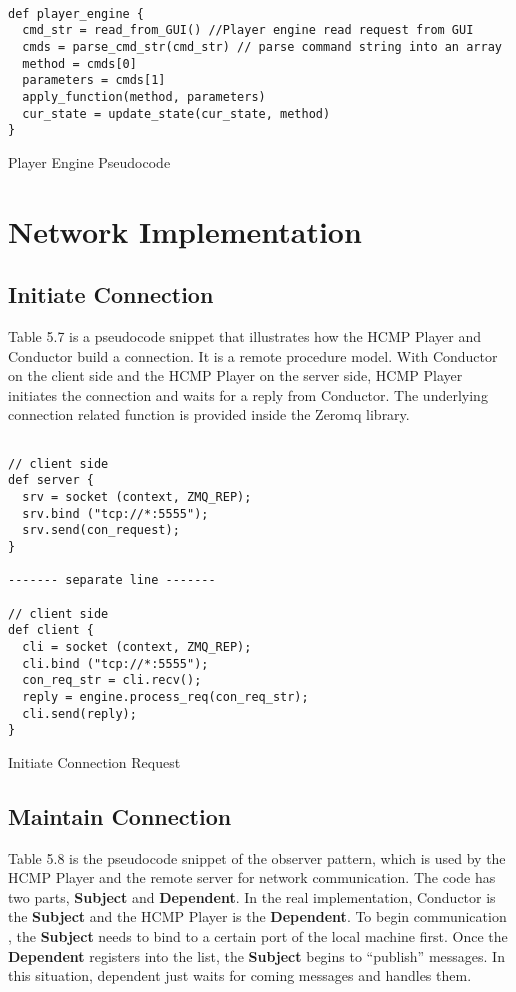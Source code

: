 \begin{table}[htdp]
\centering
\begin{lstlisting}

def player_engine {
  cmd_str = read_from_GUI() //Player engine read request from GUI 
  cmds = parse_cmd_str(cmd_str) // parse command string into an array
  method = cmds[0]
  parameters = cmds[1]
  apply_function(method, parameters)
  cur_state = update_state(cur_state, method)
}

\end{lstlisting}
\caption[Player Engine Pseudocode]{Player Engine Pseudocode}
\end{table}

\section{Network Implementation}

\subsection{Initiate Connection}
Table 5.7 is a pseudocode snippet that illustrates how the HCMP Player and   
Conductor build a connection. It is a remote procedure model.
With Conductor on the client side and the HCMP Player on the server side, HCMP 
Player initiates the connection and waits for a reply from Conductor. The 
underlying connection related function is provided inside the Zeromq library.

\begin{table}[htdp]
\centering
\begin{lstlisting}

// client side
def server {
  srv = socket (context, ZMQ_REP);
  srv.bind ("tcp://*:5555");
  srv.send(con_request);
}

------- separate line -------

// client side
def client {
  cli = socket (context, ZMQ_REP);
  cli.bind ("tcp://*:5555");
  con_req_str = cli.recv();
  reply = engine.process_req(con_req_str);
  cli.send(reply);
}

\end{lstlisting}
\caption[Initiate Connection Request]{Initiate Connection Request}
\end{table}

\subsection{Maintain Connection}  
Table 5.8 is the pseudocode snippet of the observer pattern, 
which is used by the HCMP Player and the remote server for network
communication. The code has two parts, {\bf Subject} and {\bf Dependent}. In 
the real implementation, Conductor is the {\bf Subject} and the HCMP Player 
is the {\bf Dependent}. To begin communication 
, the {\bf Subject} needs to bind to a certain port of the local machine first. 
Once the {\bf Dependent} registers into the list, the {\bf Subject} begins 
to ``publish'' messages. In this situation, dependent just waits for coming 
messages and handles them.

